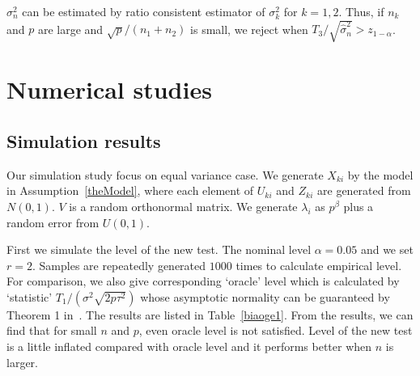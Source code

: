 \documentclass[review]{elsarticle}
\theoremstyle{plain}
\theoremstyle{definition}
\theoremstyle{remark}
\begin{document}
 $\sigma_n^2$ can be estimated by ratio consistent estimator of $\sigma^2_k$ for $k=1,2$. Thus, if $n_k$ and $p$ are large and ${\sqrt{p}}/{(n_1+n_2)}$ is small, we reject when $T_3/\sqrt{\hat{\sigma}_n^2}>z_{1-\alpha}$. 




\section{Numerical studies}
\subsection{Simulation results}

Our simulation study focus on equal variance case. 
We generate $X_{ki}$ by the model in Assumption~\ref{theModel}, where each element of $U_{ki}$ and $Z_{ki}$ are generated from $N(0,1)$.
$V$ is a random orthonormal matrix. 
We generate $\lambda_i$ as $p^{\beta}$ plus a random error from $U(0,1)$.


First we simulate the level of the new test. The nominal level $\alpha=0.05$ and we set $r=2$. Samples are repeatedly generated $1000$ times to calculate empirical level.  For comparison, we also give corresponding `oracle' level which is calculated by `statistic' ${T_1}/(\sigma^2\sqrt{2p\tau^2})$ whose asymptotic normality can be guaranteed by Theorem 1 in~\cite{Chen2010A}. The results are listed in
Table~\ref{biaoge1}. From the results, we can find that for small $n$ and $p$, even oracle level is not satisfied. Level of the new test is  a little inflated compared with oracle level and it performs better when $n$ is larger.
\end{document}
